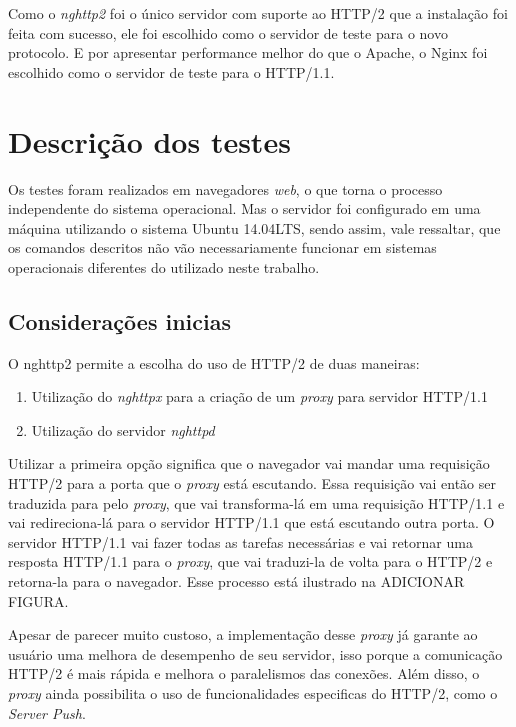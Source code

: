 Como o \textit{nghttp2} foi o único servidor com suporte ao HTTP/2 que a instalação foi feita com sucesso, ele foi escolhido como o servidor de teste para o novo protocolo. E por apresentar performance melhor do que o Apache, o Nginx foi escolhido como o servidor de teste para o HTTP/1.1.


\section{Descrição dos testes}
\label{descricaodostestes}

Os testes foram realizados em navegadores \textit{web}, o que torna o processo independente do sistema operacional. Mas o servidor foi configurado em uma máquina utilizando o sistema Ubuntu 14.04LTS, sendo assim, vale ressaltar, que os comandos descritos não vão necessariamente funcionar em sistemas operacionais diferentes do utilizado neste trabalho.

\subsection{Considerações inicias}
\label{consideracoesiniciais}

O nghttp2 permite a escolha do uso de HTTP/2 de duas maneiras:
\begin{enumerate}
	\item Utilização do \textit{nghttpx} para a criação de um \textit{proxy} para servidor HTTP/1.1
	\item Utilização do servidor \textit{nghttpd}
\end{enumerate}

Utilizar a primeira opção significa que o navegador vai mandar uma requisição HTTP/2 para a porta que o \textit{proxy} está escutando. Essa requisição vai então ser traduzida para pelo \textit{proxy}, que vai transforma-lá em uma requisição HTTP/1.1 e vai redireciona-lá para o servidor HTTP/1.1 que está escutando outra porta. O servidor HTTP/1.1 vai fazer todas as tarefas necessárias e vai retornar uma resposta HTTP/1.1 para o \textit{proxy}, que vai traduzi-la de volta para o HTTP/2 e retorna-la para o navegador. Esse processo está ilustrado na ADICIONAR FIGURA.

Apesar de parecer muito custoso, a implementação desse \textit{proxy} já garante ao usuário uma melhora de desempenho de seu servidor, isso porque a comunicação HTTP/2 é mais rápida e melhora o paralelismos das conexões. Além disso, o \textit{proxy} ainda possibilita o uso de funcionalidades especificas do HTTP/2, como o \textit{Server Push}.

